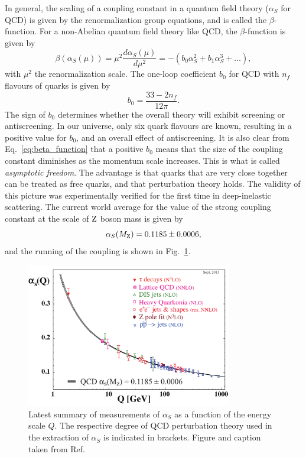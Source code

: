 In general, the scaling of a coupling constant in a quantum field theory ($\alpha_S$ for QCD) is
given by the renormalization group equations, and is called the $\beta$-function. For a non-Abelian
quantum field theory like QCD, the $\beta$-function is given by
\begin{equation}
\beta(\alpha_S(\mu)) = \mu^2 \frac{d\alpha_S(\mu)}{d\mu^2} = - (b_0 \alpha_S^2 +  b_1 \alpha_S^3 +
\ldots), 
\label{eq:beta_function}
\end{equation}
with $\mu^2$ the renormalization scale. The one-loop coefficient $b_0$ for QCD with $n_f$ flavours
of quarks is given by
\begin{equation}
  b_0 = \frac{33 - 2n_f}{12\pi}.
\end{equation}
The sign of $b_0$ determines whether the overall theory will exhibit screening or antiscreening. In
our universe, only six quark flavours are known, resulting in a positive value for $b_0$, and an
overall effect of antiscreening. 
It is also clear from Eq.~\ref{eq:beta_function} that a positive $b_0$ means that the size of the
coupling constant diminishes as the momentum scale increases. This is what is called
\textit{asymptotic freedom}. The advantage is that quarks that are very close together can be
treated as free quarks, and that perturbation theory holds. The validity of this picture was
experimentally verified for the first time in deep-inelastic scattering. 
The current world average for the value of the strong coupling constant at the scale of $\mathrm{Z}$
boson mass is given by
\begin{equation}
  \alpha_S(M_{\mathrm{Z}}) = 0.1185 \pm 0.0006, 
\end{equation}
and the running of the coupling is shown in Fig.~\ref{fig:running_coupling}. 

\begin{figure}[htpb]
  \centering
  \includegraphics[width=0.8\textwidth]{figures/standardmodel/asq-2013}
  \caption{Latest summary of measurements of $\alpha_S$ as a function of the energy scale $Q$.
The respective degree of QCD perturbation theory used in the extraction of $\alpha_S$ is
indicated in brackets. Figure and caption taken from Ref.~\cite{Agashe:2014kda}
  \label{fig:running_coupling}}
\end{figure}

